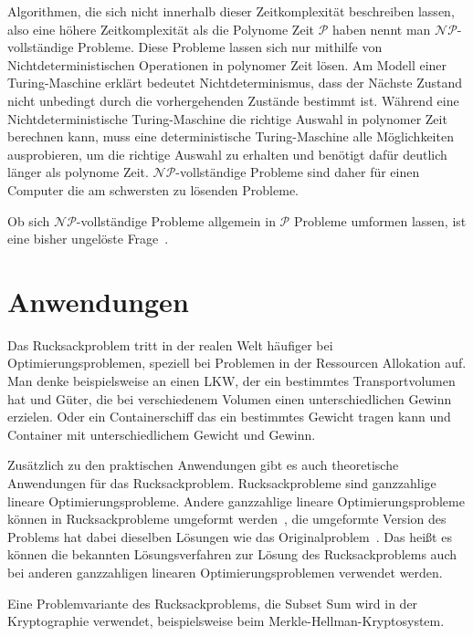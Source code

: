 \documentclass[12pt, a4paper, ngerman]{article}
\begin{document}
Algorithmen, die sich nicht innerhalb dieser Zeitkomplexität beschreiben lassen,
also eine höhere Zeitkomplexität als die Polynome Zeit \(\mathcal{P}\) haben
nennt man \(\mathcal{NP}\)-vollständige Probleme.
Diese Probleme lassen sich nur mithilfe von Nichtdeterministischen Operationen
in polynomer Zeit lösen.
Am Modell einer Turing-Maschine erklärt bedeutet Nichtdeterminismus,
dass der Nächste Zustand nicht unbedingt durch die vorhergehenden Zustände bestimmt ist.
Während eine Nichtdeterministische Turing-Maschine die richtige Auswahl in polynomer Zeit berechnen kann,
muss eine deterministische Turing-Maschine alle Möglichkeiten ausprobieren, um die richtige Auswahl zu erhalten
und benötigt dafür deutlich länger als polynome Zeit.
\(\mathcal{NP}\)-vollständige Probleme sind daher für einen Computer
die am schwersten zu lösenden Probleme.

Ob sich \(\mathcal{NP}\)-vollständige Probleme allgemein in \(\mathcal{P}\) Probleme umformen lassen,
ist eine bisher ungelöste Frage~\cite[Kap. 15]{KombinatorischeOptimierung}.

\section{Anwendungen}

Das Rucksackproblem tritt in der realen Welt häufiger bei Optimierungsproblemen,
speziell bei Problemen in der Ressourcen Allokation auf.
Man denke beispielsweise an einen LKW, der ein bestimmtes Transportvolumen hat und Güter,
die bei verschiedenem Volumen einen unterschiedlichen Gewinn erzielen.
Oder ein Containerschiff das ein bestimmtes Gewicht tragen kann
und Container mit unterschiedlichem Gewicht und Gewinn.

Zusätzlich zu den praktischen Anwendungen gibt es auch theoretische Anwendungen für das Rucksackproblem.
Rucksackprobleme sind ganzzahlige lineare Optimierungsprobleme.
Andere ganzzahlige lineare Optimierungsprobleme können in Rucksackprobleme umgeformt werden~\cite{mainKnapsack},
die umgeformte Version des Problems hat dabei dieselben Lösungen wie das Originalproblem~\cite{mainKnapsack}.
Das heißt es können die bekannten Lösungsverfahren zur Lösung des Rucksackproblems
auch bei anderen ganzzahligen linearen Optimierungsproblemen verwendet werden.

Eine Problemvariante des Rucksackproblems, die Subset Sum wird in der Kryptographie verwendet,
beispielsweise beim Merkle-Hellman-Kryptosystem.
\end{document}
